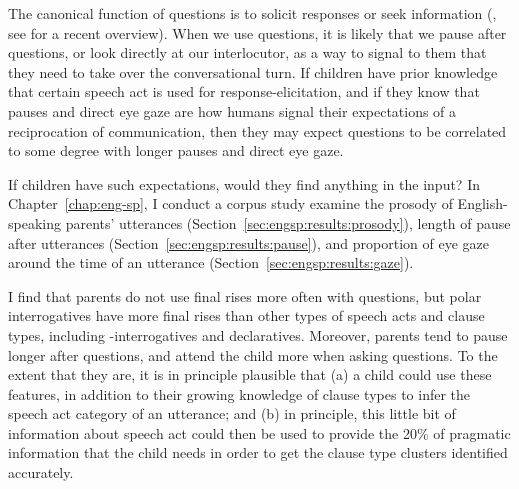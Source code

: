The canonical function of questions is to solicit responses or seek information (\citealt{searle1975tax,levinson1983,stivers2010}, see \citealt{krifka2011q} for a recent overview). When we use questions, it is likely that we pause after questions, or look directly at our interlocutor, as a way to signal to them that they need to take over the conversational turn. If children have prior knowledge that certain speech act is used for response-elicitation, and if they know that pauses and direct eye gaze are how humans signal their expectations of a reciprocation of communication, then they may expect questions to be correlated to some degree with longer pauses and direct eye gaze.

If children have such expectations, would they find anything in the input? In Chapter~\ref{chap:eng-sp}, 
I conduct a corpus study examine the prosody of English-speaking parents' utterances (Section~\ref{sec:engsp:results:prosody}), length of pause after utterances (Section~\ref{sec:engsp:results:pause}), and proportion of eye gaze around the time of an utterance (Section~\ref{sec:engsp:results:gaze}). 


I find that parents do not use final rises more often with questions, but polar interrogatives have more final rises than other types of speech acts and clause types, including \twh-interrogatives and declaratives. Moreover, parents tend to pause longer after questions, and attend the child more when asking questions. To the extent that they are, it is in principle plausible that (a) a child could use these features, in addition to their growing knowledge of clause types to infer the speech act category of an utterance; and (b) in principle, this little bit of information about speech act could then be used to provide the 20\% of pragmatic information that the child needs in order to get the clause type clusters identified accurately. 

